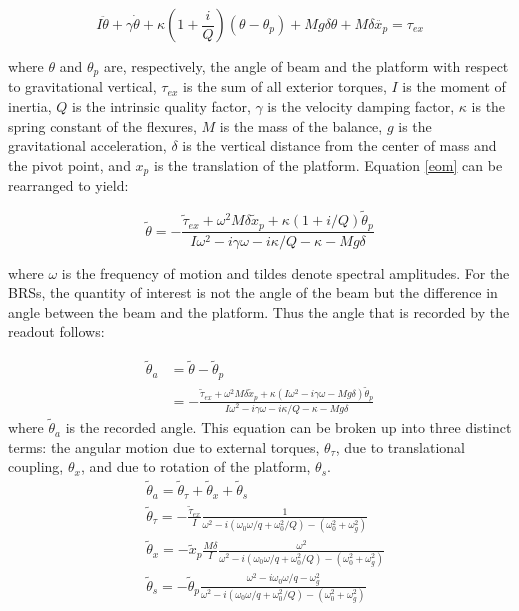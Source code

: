 \documentclass [12pt, proquest]{uwthesis}[2019]
\begin{document}
\begin{equation}
I \ddot{\theta}+ \gamma \dot{\theta}+\kappa (1+ \frac{i}{Q})(\theta-\theta_p)+M g \delta \theta +M \delta \ddot{x_p}=\tau_{ex} \label{eom}
\end{equation}

where $\theta$ and $\theta_p$ are, respectively, the angle of beam and the platform with respect to gravitational vertical, $\tau_{ex}$ is the sum of all exterior torques, $I$ is the moment of inertia, $Q$ is the intrinsic quality factor, $\gamma$ is the velocity damping factor, $\kappa$ is the spring constant of the flexures, $M$ is the mass of the balance, $g$ is the gravitational acceleration, $\delta$ is the vertical distance from the center of mass and the pivot point, and $x_p$ is the translation of the platform. Equation \ref{eom} can be rearranged to yield:

\begin{equation}
\tilde{\theta} = -\frac{\tilde{\tau}_{ex}+\omega^2 M \delta \tilde{x}_p+\kappa (1+i/Q) \tilde{\theta}_p}{I\omega^2-i \gamma \omega -i \kappa /Q-\kappa -Mg\delta}
\end{equation}

where $\omega$ is the frequency of motion and tildes denote spectral amplitudes. For the BRSs, the quantity of interest is not the angle of the beam but the difference in angle between the beam and the platform. Thus the angle that is recorded by the readout follows:

\begin{align}
\tilde{\theta}_a &=\tilde{\theta}-\tilde{\theta}_p\\
&= -\frac{\tilde{\tau}_{ex}+\omega^2 M \delta \tilde{x}_p+\kappa (I\omega^2-i\gamma \omega -Mg\delta) \tilde{\theta}_p}{I\omega^2-i \gamma \omega -i \kappa /Q-\kappa -Mg\delta}
\end{align}
where $\tilde{\theta}_a$ is the recorded angle. This equation can be broken up into three distinct terms: the angular motion due to external torques, $\theta_\tau$, due to translational coupling, $\theta_x$, and due to rotation of the platform, $\theta_s$.
\begin{align}
&\tilde{\theta}_a =\tilde{\theta}_\tau+\tilde{\theta}_x+\tilde{\theta}_{s} \label{theta_A} \\ 
&\tilde{\theta}_\tau= -\frac{\tilde{\tau}_{ex}}{I}\frac{1}{\omega^2-i (\omega_0 \omega/q+\omega_0^2/Q)-(\omega_0^2+\omega_g^2)}\\
&\tilde{\theta}_x= -\tilde{x}_p\frac{M\delta}{I} \frac{\omega^2}{\omega^2-i (\omega_0 \omega/q+\omega_0^2/Q)-(\omega_0^2+\omega_g^2)}\\
&\tilde{\theta}_{s}= -\tilde{\theta}_p\frac{\omega^2-i\omega_0 \omega/q-\omega_g^2}{\omega^2-i (\omega_0 \omega/q+\omega_0^2/Q)-(\omega_0^2+\omega_g^2)}\label{theta_s}
\end{align}
\end{document}
